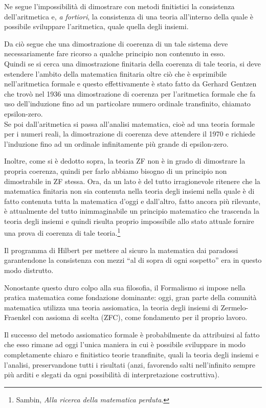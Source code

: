 Ne segue l'impossibilità di dimostrare con metodi finitistici la consistenza dell'aritmetica e, \emph{a fortiori}, la consistenza di una teoria all'interno della quale è possibile sviluppare l'aritmetica, quale quella degli insiemi.

Da ciò segue che una dimostrazione di coerenza di un tale sistema deve ne\-ces\-sa\-ria\-men\-te fare ricorso a qualche principio non contenuto in esso.\\
Quindi se si cerca una dimostrazione finitaria della coerenza di tale teoria, si deve estendere l'ambito della matematica finitaria oltre ciò che è esprimibile nell'aritmetica formale e questo effettivamente è stato fatto da Gerhard Gentzen che trovò nel 1936 una dimostrazione di coerenza per l'a\-ritme\-ti\-ca formale che fa uso dell'induzione fino ad un particolare numero ordinale transfinito, chiamato epsilon-zero.\\
Se poi dall'aritmetica si passa all'analisi matematica, cioè ad una teoria formale per i numeri reali, la dimostrazione di coerenza deve attendere il 1970 e richiede l'induzione fino ad un ordinale infinitamente più grande di epsilon-zero. 

Inoltre, come si è dedotto sopra, la teoria ZF non è in grado di dimostrare la propria coerenza, quindi per farlo abbiamo bisogno di un principio non dimostrabile in ZF stessa. Ora, da un lato è del tutto irragionevole ritenere che la matematica finitaria non sia contenuta nella teoria degli insiemi nella quale è di fatto contenuta tutta la matematica d'oggi e dall'altro, fatto ancora più rilevante, è attualmente del tutto inimmaginabile un principio matematico che trascenda la teoria degli insiemi e quindi risulta proprio impossibile allo stato attuale fornire una prova di coerenza di tale teoria.\footnote{Sambin, \emph{Alla ricerca della matematica perduta}.}
\bigskip

Il programma di Hilbert per mettere al sicuro la matematica dai paradossi garantendone la consistenza con mezzi ``al di sopra di ogni sospetto'' era in questo modo distrutto.

Nonostante questo duro colpo alla sua filosofia, il Formalismo si impose nella pratica matematica come fondazione dominante: oggi, gran parte della comunità matematica utilizza una teoria assiomatica, la teoria degli insiemi di Zermelo-Fraenkel con assioma di scelta (ZFC), come fondamento per il proprio lavoro.

Il successo del metodo assiomatico formale è probabilmente da attribuirsi al fatto che esso rimane ad oggi l'unica maniera in cui è possibile sviluppare in modo completamente chiaro e finitistico teorie transfinite, quali la teoria degli insiemi e l'analisi, preservandone tutti i risultati (anzi, favorendo salti nell'infinito sempre più arditi e slegati da ogni possibilità di interpretazione costruttiva).

